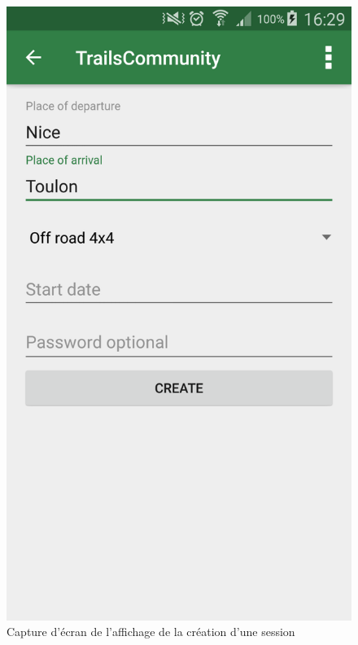 \documentclass[titlepage, 12pt]{report}
\begin{document}
\begin{figure}[!h]
	\caption{Capture d'écran de l'affichage de la création d'une session}
	\label{screenshots_create_session}
	\centering
	\includegraphics[scale=0.2]{Images/screenshots/create_session.png}
\end{figure}

\clearpage
\end{document}

